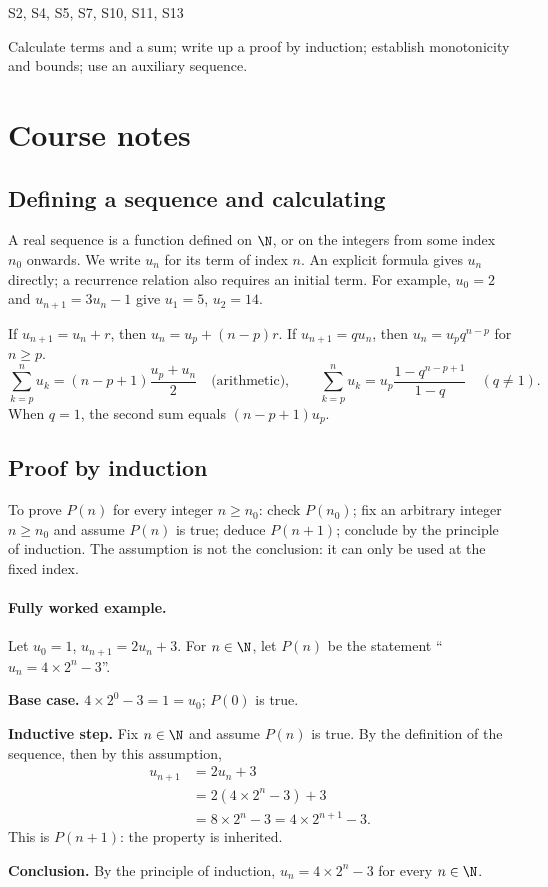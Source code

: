 \setcounter{chapter}{0}\label{ch:1}

{\small\sffamily\color{mxmint}S2, S4, S5, S7, S10, S11, S13\par}

\begin{keypoint}[Objectives]Calculate terms and a sum; write up a proof by induction; establish monotonicity and bounds; use an auxiliary sequence.\end{keypoint}

\section{Course notes}
\subsection{Defining a sequence and calculating}
A real sequence is a function defined on $\N$, or on the integers from some index $n_0$ onwards. We write $u_n$ for its term of index $n$. An explicit formula gives $u_n$ directly; a recurrence relation also requires an initial term. For example, $u_0=2$ and $u_{n+1}=3u_n-1$ give $u_1=5$, $u_2=14$.
\begin{keypoint}
If $u_{n+1}=u_n+r$, then $u_n=u_p+(n-p)r$. If $u_{n+1}=qu_n$, then $u_n=u_pq^{n-p}$ for $n\ge p$.
\[\sum_{k=p}^n u_k=(n-p+1)\frac{u_p+u_n}{2}\quad\text{(arithmetic)},\qquad
\sum_{k=p}^n u_k=u_p\frac{1-q^{n-p+1}}{1-q}\quad(q\ne1).\]
When $q=1$, the second sum equals $(n-p+1)u_p$.
\end{keypoint}
\subsection{Proof by induction}
To prove $P(n)$ for every integer $n\ge n_0$: check $P(n_0)$; fix an arbitrary integer $n\ge n_0$ and assume $P(n)$ is true; deduce $P(n+1)$; conclude by the principle of induction. The assumption is not the conclusion: it can only be used at the fixed index.
\paragraph{Fully worked example.} Let $u_0=1$, $u_{n+1}=2u_n+3$. For $n\in\N$, let $P(n)$ be the statement ``$u_n=4\times2^n-3$''.
\par\smallskip\textbf{Base case.} $4\times2^0-3=1=u_0$; $P(0)$ is true.
\par\smallskip\textbf{Inductive step.} Fix $n\in\N$ and assume $P(n)$ is true. By the definition of the sequence, then by this assumption,
\[\begin{aligned}u_{n+1}&=2u_n+3\\&=2(4\times2^n-3)+3\\&=8\times2^n-3=4\times2^{n+1}-3.\end{aligned}\]
This is $P(n+1)$: the property is inherited.
\par\smallskip\textbf{Conclusion.} By the principle of induction, $u_n=4\times2^n-3$ for every $n\in\N$.
